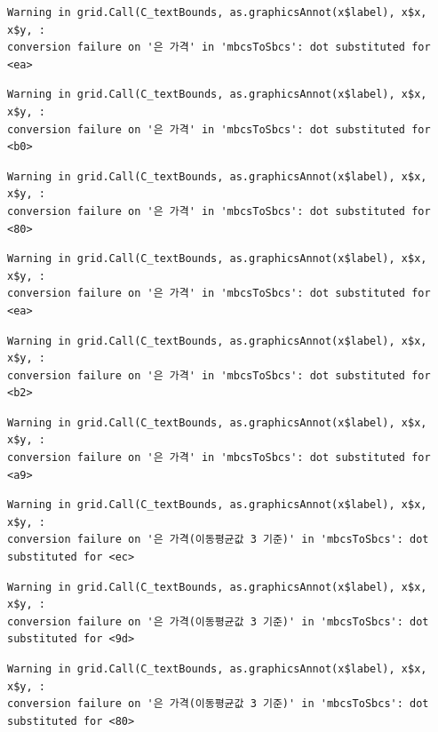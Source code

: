 \documentclass[
  letterpaper,
  DIV=11,
  numbers=noendperiod]{scrreprt}
\begin{document}
\begin{verbatim}
Warning in grid.Call(C_textBounds, as.graphicsAnnot(x$label), x$x, x$y, :
conversion failure on '은 가격' in 'mbcsToSbcs': dot substituted for <ea>
\end{verbatim}

\begin{verbatim}
Warning in grid.Call(C_textBounds, as.graphicsAnnot(x$label), x$x, x$y, :
conversion failure on '은 가격' in 'mbcsToSbcs': dot substituted for <b0>
\end{verbatim}

\begin{verbatim}
Warning in grid.Call(C_textBounds, as.graphicsAnnot(x$label), x$x, x$y, :
conversion failure on '은 가격' in 'mbcsToSbcs': dot substituted for <80>
\end{verbatim}

\begin{verbatim}
Warning in grid.Call(C_textBounds, as.graphicsAnnot(x$label), x$x, x$y, :
conversion failure on '은 가격' in 'mbcsToSbcs': dot substituted for <ea>
\end{verbatim}

\begin{verbatim}
Warning in grid.Call(C_textBounds, as.graphicsAnnot(x$label), x$x, x$y, :
conversion failure on '은 가격' in 'mbcsToSbcs': dot substituted for <b2>
\end{verbatim}

\begin{verbatim}
Warning in grid.Call(C_textBounds, as.graphicsAnnot(x$label), x$x, x$y, :
conversion failure on '은 가격' in 'mbcsToSbcs': dot substituted for <a9>
\end{verbatim}

\begin{verbatim}
Warning in grid.Call(C_textBounds, as.graphicsAnnot(x$label), x$x, x$y, :
conversion failure on '은 가격(이동평균값 3 기준)' in 'mbcsToSbcs': dot
substituted for <ec>
\end{verbatim}

\begin{verbatim}
Warning in grid.Call(C_textBounds, as.graphicsAnnot(x$label), x$x, x$y, :
conversion failure on '은 가격(이동평균값 3 기준)' in 'mbcsToSbcs': dot
substituted for <9d>
\end{verbatim}

\begin{verbatim}
Warning in grid.Call(C_textBounds, as.graphicsAnnot(x$label), x$x, x$y, :
conversion failure on '은 가격(이동평균값 3 기준)' in 'mbcsToSbcs': dot
substituted for <80>
\end{verbatim}
\end{document}
